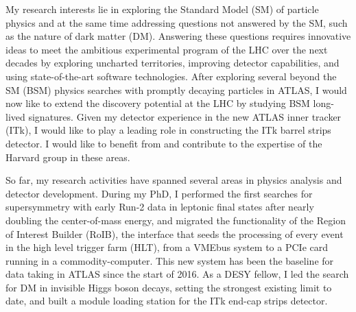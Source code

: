 \documentclass[a4paper]{article}
\begin{document}
\thispagestyle{fancy} 
 \lfoot{} \rfoot{\bf \thepage} \cfoot{}

\fontsize{11}{14}
\selectfont

My research interests lie in exploring the Standard Model (SM) of particle physics and at the same time addressing questions not answered by the SM, such as the nature of dark matter (DM). Answering these questions requires innovative ideas to meet the ambitious experimental program of the LHC over the next decades by exploring uncharted territories, improving detector capabilities, and using state-of-the-art software technologies. After exploring several beyond the SM (BSM) physics searches with promptly decaying particles in ATLAS, I would now like to extend the discovery potential at the LHC by studying BSM long-lived signatures. Given my detector experience in the new ATLAS inner tracker (ITk), I would like to play a leading role in constructing the ITk barrel strips detector. I would like to benefit from and contribute to the expertise of the Harvard group in these areas.



\bigskip

So far, my research activities have spanned several areas in physics analysis and detector development. During my PhD, I performed the first searches for supersymmetry with early Run-2 data in leptonic final states after nearly doubling the center-of-mass energy\cite{SS3L}, and migrated the functionality of the Region of Interest Builder (RoIB), the interface that seeds the processing of every event in the high level trigger farm (HLT), from a VMEbus system to a PCIe card running in a commodity-computer\cite{proc-TWEPP2015-RoIB}. This new system has been the baseline for data taking in ATLAS since the start of 2016. As a DESY fellow, I led the search for DM in invisible Higgs boson decays, setting the strongest existing limit to date, and built a module loading station for the ITk end-cap strips detector.

\bigskip
\end{document}
